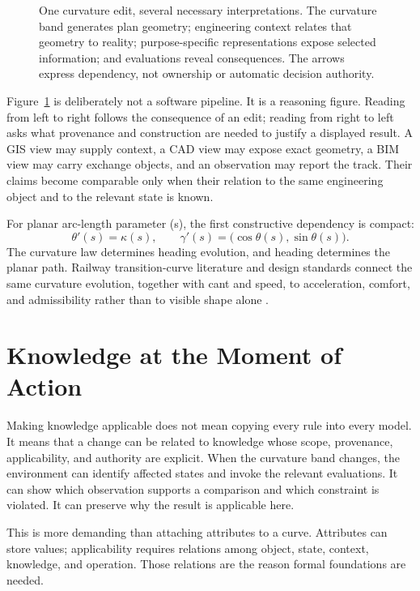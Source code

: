 \begin{figure}[H]
\centering

\caption{One curvature edit, several necessary interpretations. The curvature
band generates plan geometry; engineering context relates that geometry to
reality; purpose-specific representations expose selected information; and
evaluations reveal consequences. The arrows express dependency, not ownership
or automatic decision authority.}
\label{fig:curvature-consequence-chain}
\end{figure}

Figure~\ref{fig:curvature-consequence-chain} is deliberately not a software
pipeline. It is a reasoning figure. Reading from left to right follows the
consequence of an edit; reading from right to left asks what provenance and
construction are needed to justify a displayed result. A GIS view may supply
context, a CAD view may expose exact geometry, a BIM view may carry exchange
objects, and an observation may report the track. Their claims become
comparable only when their relation to the same engineering object and to the
relevant state is known.

For planar arc-length parameter (s), the first constructive dependency is
compact:
\[
  \theta'(s)=\kappa(s),
  \qquad
  \gamma'(s)=\bigl(\cos\theta(s),\sin\theta(s)\bigr).
\]
The curvature law determines heading evolution, and heading determines the
planar path. Railway transition-curve literature and design standards connect
the same curvature evolution, together with cant and speed, to acceleration,
comfort, and admissibility rather than to visible shape alone
\cite{Kufver1997MathematicalDescription,Kufver2000RailwayAlignment,EN13803_2017,BrustadDalmo2020Review}.

\section{Knowledge at the Moment of Action}

Making knowledge applicable does not mean copying every rule into every model.
It means that a change can be related to knowledge whose scope, provenance,
applicability, and authority are explicit. When the curvature band changes, the
environment can identify affected states and invoke the relevant evaluations.
It can show which observation supports a comparison and which constraint is
violated. It can preserve why the result is applicable here.

This is more demanding than attaching attributes to a curve. Attributes can
store values; applicability requires relations among object, state, context,
knowledge, and operation. Those relations are the reason formal foundations are
needed.

